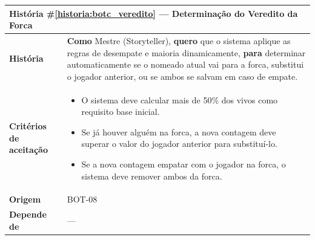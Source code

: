 \documentclass[12pt,a4paper]{article}
\newcounter{historia}
\begin{document}
\label{historia:botc_veredito}
\begin{table}[H]
    \centering
    \begin{tabular}{|m{4.5cm} | m{11cm}|}
    \hline
    \multicolumn{2}{|l|}{\textbf{História \#\ref{historia:botc_veredito} --- Determinação do Veredito da Forca}} \\
    \hline  \textbf{História} &
    \textbf{Como} Mestre (Storyteller), \newline
    \textbf{quero} que o sistema aplique as regras de desempate e maioria dinamicamente, \newline  
    \textbf{para} determinar automaticamente se o nomeado atual vai para a forca, substitui o jogador anterior, ou se ambos se salvam em caso de empate. \\
    \textbf{Critérios de aceitação} &
    \begin{itemize}
        \item{O sistema deve calcular mais de 50\% dos vivos como requisito base inicial.}
        \item{Se já houver alguém na forca, a nova contagem deve superar o valor do jogador anterior para substituí-lo.}
        \item{Se a nova contagem empatar com o jogador na forca, o sistema deve remover ambos da forca.}
    \end{itemize}\\
    \textbf{Origem} & BOT-08 \\
    \textbf{Depende de} & --- \\
    \hline
    \end{tabular}
\end{table}
\end{document}
